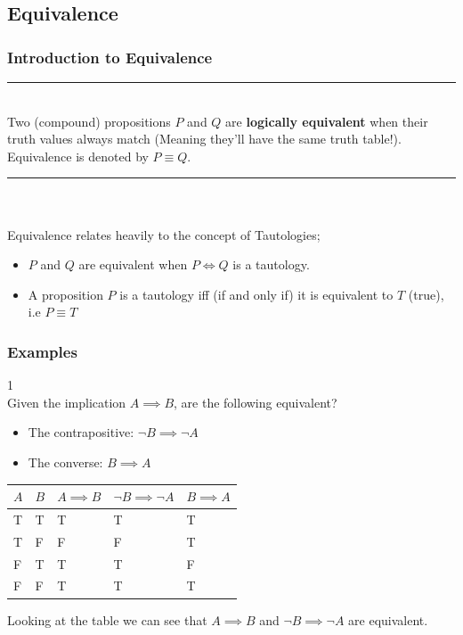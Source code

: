 \documentclass[12pt, letterpaper]{article}
\newcommand{\exheader}[1][ex]{{\tiny{#1}\normalsize}}
\newcommand{\horizline}[0]{\noindent\rule{\textwidth}{1pt}\\}
\begin{document}
\subsection{Equivalence}
\bigbreak
\subsubsection{Introduction to Equivalence}

\horizline
\faBook \space Two (compound) propositions $P$ and $Q$ are \textbf{logically equivalent} when their truth values always match (Meaning they'll have the same truth table!). \\
Equivalence is denoted by $P \equiv Q$.\\
\horizline
\\
Equivalence relates heavily to the concept of Tautologies;
\begin{itemize}[label={}, leftmargin=*]
	\item $P$ and $Q$ are equivalent when $P \iff Q$ is a tautology.
	\item A proposition $P$ is a tautology iff (if and only if) it is equivalent to $T$ (true), i.e $P \equiv T$
\end{itemize}

\bigbreak

\subsubsection*{Examples}
\exheader[1]\\
Given the implication $A \implies B$, are the following equivalent?
\begin{itemize}[leftmargin=*, label={}]
	\item The contrapositive: $\neg B \implies \neg A$
	\item The converse: $B \implies A$
\end{itemize}
\bigbreak
\begin{center}
\begin{tabular}{l | l || l | l | l}
	\hline 
	$A$ & $B$ & $A \implies B$ & $ \neg B \implies \neg A $ & $B \implies A$ \\
	\hline
	T & T & T & T & T \\
	T & F & F & F & T \\
	F & T & T & T & F \\
	F & F & T & T & T
	\end{tabular} 
\end{center} \bigbreak
Looking at the table we can see that $A \implies B$ and $\neg B \implies \neg A$ are equivalent.
\bigbreak
\end{document}
